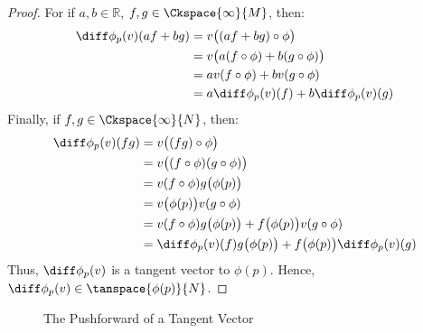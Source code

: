 \documentclass{article}                                                        %
\begin{document}
            \begin{proof}
                For if $a,b\in\mathbb{R}$, $f,g\in\Ckspace{\infty}{M}$, then:
                \begin{subequations}
                    \begin{align}
                        \diff\phi_{p}(v)(af+bg)
                            &=v\big((af+bg)\circ\phi\big)\\
                            &=v\big(a(f\circ\phi)+b(g\circ\phi)\big)\\
                            &=av(f\circ\phi)+bv(g\circ\phi)\\
                            &=a\diff\phi_{p}(v)(f)+b\diff\phi_{p}(v)(g)
                    \end{align}
                \end{subequations}
                Finally, if $f,g\in\Ckspace{\infty}{N}$, then:
                \begin{subequations}
                    \begin{align}
                        \diff\phi_{p}(v)(fg)
                            &=v\big((fg)\circ\phi\big)\\
                            &=v\big((f\circ\phi)(g\circ\phi)\big)\\
                            &=v(f\circ\phi)g\big(\phi(p)\big)\\
                            &=v\big(\phi(p)\big)v(g\circ\phi)\\
                            &=v(f\circ\phi)g\big(\phi(p)\big)
                             +f\big(\phi(p)\big)v(g\circ\phi)\\
                            &=\diff\phi_{p}(v)(f)g\big(\phi(p)\big)
                             +f\big(\phi(p)\big)\diff\phi_{p}(v)(g)
                    \end{align}
                \end{subequations}
                Thus, $\diff\phi_{p}(v)$ is a tangent vector to $\phi(p)$.
                Hence, $\diff\phi_{p}(v)\in\tanspace{\phi(p)}{N}$.
            \end{proof}
            \begin{figure}[H]
                \centering
                \captionsetup{type=figure}
                
                \caption{The Pushforward of a Tangent Vector}
                \label{fig:Pushforward_of_Tangent_Vector}
            \end{figure}
\end{document}
